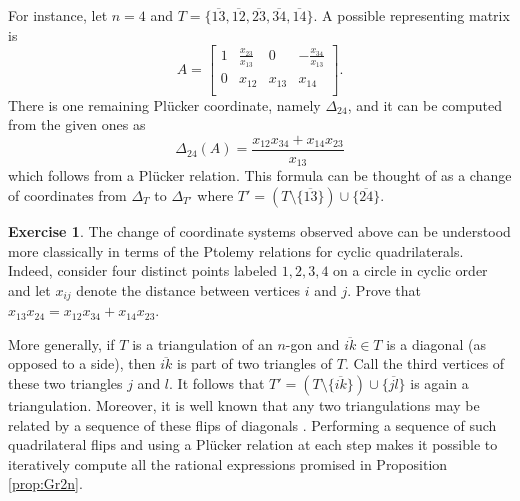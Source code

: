 \documentclass{amsart}
\theoremstyle{definition}
\newtheorem{exercise}[theorem]{Exercise}
\theoremstyle{remark}
\numberwithin{equation}{section}
\begin{document}
		For instance, let $n=4$ and $T = \{\overline{13},\overline{12},\overline{23},\overline{34},\overline{14}\}$.  A possible representing matrix is
		\begin{displaymath}
			A = \left[\begin{array}{cccc}
			1 & \frac{x_{23}}{x_{13}} & 0 & -\frac{x_{34}}{x_{13}} \\
			0 & x_{12} & x_{13} & x_{14} \\
			\end{array}\right].
		\end{displaymath}
		There is one remaining Pl\"ucker coordinate, namely $\Delta_{24}$, and it can be computed from the given ones as
		\begin{displaymath}
		\Delta_{24}(A) = \frac{x_{12}x_{34} + x_{14}x_{23}}{x_{13}}
		\end{displaymath}
		which follows from a Pl\"ucker relation.	This formula can be thought of as a change of coordinates from $\Delta_T$ to $\Delta_{T'}$ where $T' = (T \setminus \{\overline{13}\}) \cup \{\overline{24}\}$.  
    \setcounter{subexercise}{2}
    \begin{exercise}
      The change of coordinate systems observed above can be understood more classically in terms of the Ptolemy relations for cyclic quadrilaterals.  Indeed, consider four distinct points labeled $1,2,3,4$ on a circle in cyclic order and let $x_{ij}$ denote the distance between vertices $i$ and $j$.  Prove that $x_{13}x_{24}=x_{12}x_{34}+x_{14}x_{23}$.
    \end{exercise}
		
		More generally, if $T$ is a triangulation of an $n$-gon and $\overline{ik} \in T$ is a diagonal (as opposed to a side), then $\overline{ik}$ is part of two triangles of $T$.  Call the third vertices of these two triangles $j$ and $l$.  It follows that $T' = (T \setminus \{\overline{ik}\}) \cup \{\overline{jl}\}$ is again a triangulation.  Moreover, it is well known that any two triangulations may be related by a sequence of these flips of diagonals \cite{H91}.  Performing a sequence of such quadrilateral flips and using a Pl\"ucker relation at each step makes it possible to iteratively compute all the rational expressions promised in Proposition \ref{prop:Gr2n}.
 
\end{document}
